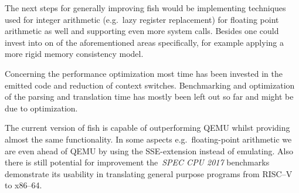The next steps for generally improving fish would be implementing techniques used for integer arithmetic (e.g.\ lazy register replacement) for floating point arithmetic as well and supporting even more system calls.
Besides one could invest into on of the aforementioned areas specifically, for example applying a more rigid memory consistency model.

Concerning the performance optimization most time has been invested in the emitted code and reduction of context switches.
Benchmarking and optimization of the parsing and translation time has mostly been left out so far and might be due to optimization.


The current version of fish is capable of outperforming QEMU whilst providing almost the same functionality.
In some aspects e.g.\ floating-point arithmetic we are even ahead of QEMU by using the SSE-extension instead of emulating.
Also there is still potential for improvement the~\textit{SPEC CPU 2017} benchmarks demonstrate its usability in translating general purpose programs from RISC--V to x86--64.